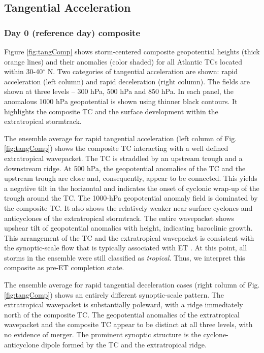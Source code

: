 \documentclass[wcd,manuscript]{copernicus}
\begin{document}
\subsection{Tangential Acceleration}


\subsubsection{Day 0 (reference day) composite}

Figure \ref{fig:tangComp} shows  storm-centered composite geopotential heights (thick orange lines) and their anomalies (color shaded) for all Atlantic TCs located within 30-40$^\circ$ N. Two categories of tangential acceleration are shown: rapid acceleration (left column) and rapid deceleration (right column).   The  fields are shown at three levels -- 300 hPa, 500 hPa and 850 hPa. In each panel, the anomalous 1000 hPa geopotential is shown using thinner black contours. It highlights the composite TC and the surface development within the extratropical stormtrack. 

The ensemble average for rapid tangential acceleration  (left column of Fig. \ref{fig:tangComp}) shows the composite TC interacting with a well defined extratropical wavepacket. The TC is straddled by an upstream trough and a downstream ridge. At 500 hPa, the geopotential anomalies of the TC and the upstream trough are close and, consequently, appear to be connected. This yields a negative tilt in the horizontal and indicates the onset of cyclonic wrap-up of the trough around the TC. The 1000-hPa geopotential anomaly field is dominated by the composite TC. It also shows the relatively weaker near-surface cyclones and anticyclones of the extratropical stormtrack. The entire wavepacket shows upshear tilt of geopotential anomalies with height, indicating baroclinic growth. This arrangement of the TC and the extratropical wavepacket is consistent with the synoptic-scale flow that is typically associated with ET \citep[e.g.,][]{KHE2000,MGY2003,RJD2008,RJ2014,K2019}. At this point, all storms in the ensemble were still classified as \emph{tropical}. Thus, we interpret this composite as pre-ET completion state. 

The ensemble average for rapid tangential deceleration cases (right column of Fig. \ref{fig:tangComp}) shows an entirely different synoptic-scale pattern. The extratropical wavepacket is substantially poleward, with a ridge immediately north of the composite TC. The geopotential anomalies of the extratropical wavepacket and the composite TC appear to be distinct at all three levels, with no evidence of merger. The prominent synoptic structure is the cyclone-anticyclone dipole formed by the TC and the extratropical ridge.
\end{document}

